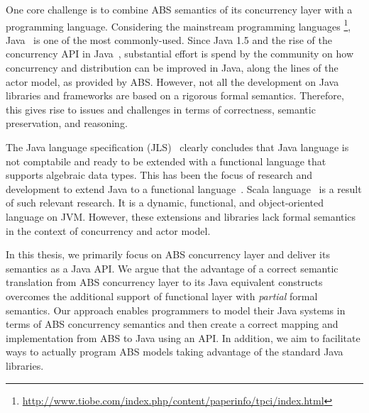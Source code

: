 One core challenge is to combine ABS semantics of its concurrency layer with a
programming language.
Considering the mainstream programming languages
\footnote{\url{http://www.tiobe.com/index.php/content/paperinfo/tpci/index.html}}, Java~\cite{gosling2000java} is one of the most commonly-used.
Since Java 1.5 and the rise of the concurrency API in Java~\cite{jsr166}, substantial effort is spend by the community on how concurrency and distribution can be improved in Java, along the lines of the actor model, as provided by ABS.
However, not all the development on Java libraries and frameworks are based on a rigorous formal semantics. 
Therefore, this gives rise to issues and challenges in terms of correctness, semantic preservation, and reasoning.

The Java language specification (JLS)~\cite{gosling2000java} clearly concludes that Java language is not comptabile and ready to be extended with a functional language that supports algebraic data types.
This has been the focus of research and development to extend Java to a functional language~\cite{odersky1997pizza,henkel2003discovering,nystrom2003polyglot,bracha1998making}.
Scala language~\cite{odersky2004scala} is a result of such relevant research. It is a dynamic, functional, and object-oriented language on JVM.
However, these extensions and libraries lack formal semantics in the context
of concurrency and actor model.

In this thesis, we primarily focus on ABS concurrency layer and deliver its semantics as a Java API.
We argue that the advantage of a correct semantic translation from ABS concurrency layer to its Java equivalent constructs overcomes the additional support of functional layer with \emph{partial} formal semantics.
Our approach enables programmers to model their Java systems in terms of ABS concurrency semantics and then create a correct mapping and implementation from ABS to Java using an API.
In addition, we aim to facilitate ways to actually program ABS models taking advantage of the standard Java libraries.

